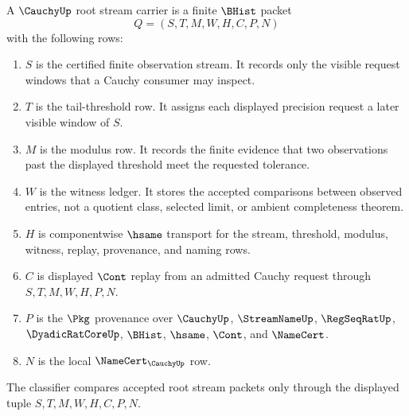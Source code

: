 \begin{definition}
\label{def:cauchy-root-stream-carrier}
A $\CauchyUp$ root stream carrier is a finite $\BHist$ packet
$$
Q=(S,T,M,W,H,C,P,N)
$$
with the following rows:
\begin{enumerate}
\item $S$ is the certified finite observation stream. It records only the visible request windows that a Cauchy consumer may inspect.
\item $T$ is the tail-threshold row. It assigns each displayed precision request a later visible window of $S$.
\item $M$ is the modulus row. It records the finite evidence that two observations past the displayed threshold meet the requested tolerance.
\item $W$ is the witness ledger. It stores the accepted comparisons between observed entries, not a quotient class, selected limit, or ambient completeness theorem.
\item $H$ is componentwise $\hsame$ transport for the stream, threshold, modulus, witness, replay, provenance, and naming rows.
\item $C$ is displayed $\Cont$ replay from an admitted Cauchy request through $S,T,M,W,H,P,N$.
\item $P$ is the $\Pkg$ provenance over $\CauchyUp$, $\StreamNameUp$, $\RegSeqRatUp$, $\DyadicRatCoreUp$, $\BHist$, $\hsame$, $\Cont$, and $\NameCert$.
\item $N$ is the local $\NameCert_{\CauchyUp}$ row.
\end{enumerate}
The classifier compares accepted root stream packets only through the displayed tuple $S,T,M,W,H,C,P,N$.
\end{definition}

